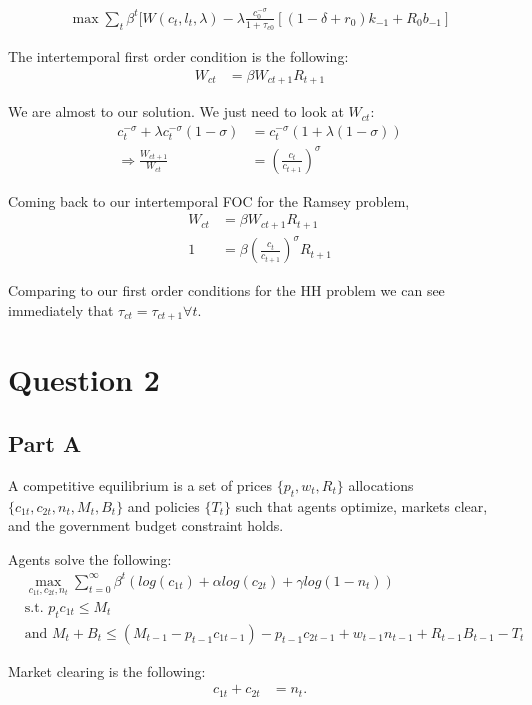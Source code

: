 \documentclass[11pt]{article} %
\begin{document}
\begin{align*}
\max \sum_t \beta^t[W(c_t,l_t,\lambda) - \lambda \frac{c_0^{-\sigma}}{1+\tau_{c0}}[(1-\delta+r_0)k_{-1} + R_{0}b_{-1}]
\end{align*}

The intertemporal first order condition is the following:
\begin{align*}
W_{ct} &= \beta W_{ct+1} R_{t+1}
\end{align*}

We are almost to our solution. We just need to look at $W_{ct}$:
\begin{align*}
c_t^{-\sigma} +\lambda c_t^{-\sigma}(1-\sigma) &= c_t^{-\sigma}(1+\lambda(1-\sigma))\\
\Rightarrow \frac{W_{ct+1}}{W_{ct}} &= \left(\frac{c_t}{c_{t+1}}\right)^{\sigma}
\end{align*}

Coming back to our intertemporal FOC for the Ramsey problem,
\begin{align*}
W_{ct} &= \beta W_{ct+1} R_{t+1} \\
1  &=\beta\left(\frac{c_t}{c_{t+1}}\right)^{\sigma}R_{t+1}
\end{align*}

Comparing to our first order conditions for the HH problem we can see immediately that $\tau_{ct} = \tau_{ct+1} \forall t$.
\section{Question 2}
\subsection{Part A}
A competitive equilibrium is a set of prices $\{ p_t,w_t,R_t \}$ allocations $\{ c_{1t},c_{2t},n_t,M_t,B_t \}$ and policies $\{T_t \}$ such that agents optimize, markets clear, and the government budget constraint holds.

Agents solve the following:
\begin{align*}
&\max_{c_{1t},c_{2t},n_t}\sum_{t=0}^{\infty}\beta^t( log(c_{1t}) + \alpha log(c_{2t}) + \gamma log(1-n_t))\\
&\text{s.t. } p_{t}c_{1t} \leq M_t\\
&\text{and }M_t + B_t \leq (M_{t-1} - p_{t-1}c_{1t-1}) - p_{t-1}c_{2t-1} + w_{t-1}n_{t-1}  + R_{t-1}B_{t-1} - T_{t}
\end{align*}

Market clearing is the following:
\begin{align*}
c_{1t} + c_{2t} &= n_t.
\end{align*}
\end{document}
